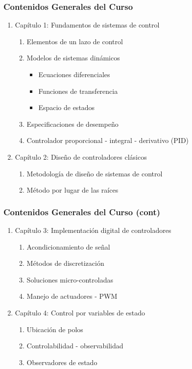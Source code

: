 \documentclass[aspectratio=169,handout]{beamer}
\theoremstyle{definition}
\theoremstyle{plain}
\theoremstyle{remark}
\newcounter{saveenumi}
\newcommand{\seti}{\setcounter{saveenumi}{\value{enumi}}}
\newcommand{\conti}{\setcounter{enumi}{\value{saveenumi}}}
\begin{document}
\begin{frame}[<+->]\frametitle{Contenidos Generales del Curso}
\begin{enumerate}
  \item Capítulo 1: Fundamentos de sistemas de control
  \begin{enumerate}
     \item Elementos de un lazo de control
     \item Modelos de sistemas dinámicos
     \begin{itemize}
       \item Ecuaciones diferenciales
       \item Funciones de transferencia
       \item Espacio de estados
     \end{itemize}
    \item Especificaciones de desempeño
    \item Controlador proporcional - integral - derivativo (PID)
   \end{enumerate}
   \item Capítulo 2: Diseño de controladores clásicos
   \begin{enumerate}
     \item Metodología de diseño de sistemas de control
     \item Método por lugar de las raíces
   \end{enumerate}
   \seti
\end{enumerate}
\end{frame}

\begin{frame}[<+->]\frametitle{Contenidos Generales del Curso (cont)}
\begin{enumerate}
  \conti
  \item Capítulo 3: Implementación digital de controladores
  \begin{enumerate}
    \item Acondicionamiento de señal
    \item Métodos de discretización
    \item Soluciones micro-controladas
    \item Manejo de actuadores - PWM    
  \end{enumerate}
  \item Capítulo 4: Control por variables de estado
  \begin{enumerate}
    \item Ubicación de polos
    \item Controlabilidad - observabilidad
    \item Observadores de estado
  \end{enumerate}
\end{enumerate}
\end{frame}
\end{document}
